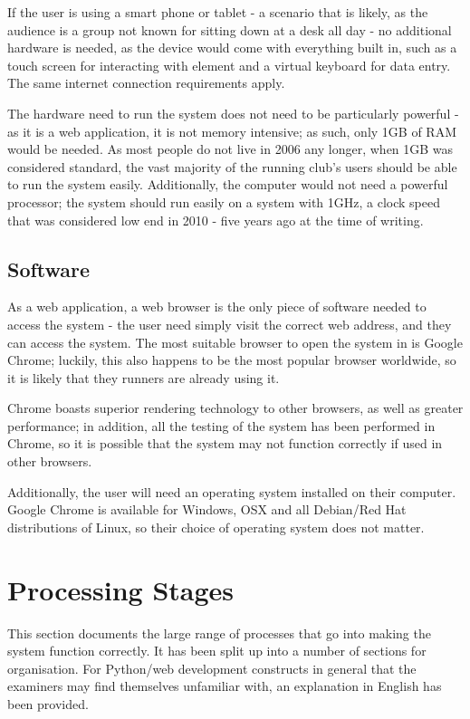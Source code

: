 \documentclass{article}[12pt,a4paper]
\begin{document}
If the user is using a smart phone or tablet - a scenario that is likely, as the audience is a group not known for sitting down at a desk all day - no additional hardware is needed, as the device would come with everything built in, such as a touch screen for interacting with element and a virtual keyboard for data entry. The same internet connection requirements apply.

The hardware need to run the system does not need to be particularly powerful - as it is a web application, it is not memory intensive; as such, only 1GB of RAM would be needed. As most people do not live in 2006 any longer, when 1GB was considered standard, the vast majority of the running club's users should be able to run the system easily. Additionally, the computer would not need a powerful processor; the system should run easily on a system with 1GHz, a clock speed that was considered low end in 2010 - five years ago at the time of writing. 

\subsection{Software}
As a web application, a web browser is the only piece of software needed to access the system - the user need simply visit the correct web address, and they can access the system. The most suitable browser to open the system in is Google Chrome; luckily, this also happens to be the most popular browser worldwide, so it is likely that they runners are already using it.

 Chrome boasts superior rendering technology to other browsers, as well as greater performance; in addition, all the testing of the system has been performed in Chrome, so it is possible that the system may not function correctly if used in other browsers. 

 Additionally, the user will need an operating system installed on their computer. Google Chrome is available for Windows, OSX and all Debian/Red Hat distributions of Linux, so their choice of operating system does not matter.

\section{Processing Stages}
This section documents the large range of processes that go into making the system function correctly. It has been split up into a number of sections for organisation. For Python/web development constructs in general that the examiners may find themselves unfamiliar with, an explanation in English has been provided.
\end{document}
